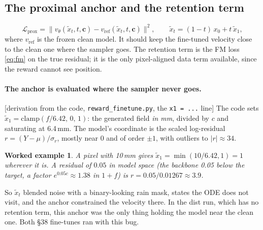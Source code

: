 \documentclass[11pt,a4paper]{article}
\newcommand{\status}[1]{\textsf{\small[#1]}}
\newtheorem*{example}{Worked example}
\begin{document}
\subsection{The proximal anchor and the retention term}
\begin{equation}
  \mathcal L_{\mathrm{prox}} = \big\|v_\theta(\tilde x_t, t,\mathbf c) - v_{\mathrm{ref}}(\tilde x_t,t,\mathbf c)\big\|^2,
  \qquad \tilde x_t = (1-t)\,x_0 + t\,\tilde x_1,
\end{equation}
where $v_{\mathrm{ref}}$ is the frozen clean model. It should keep the fine-tuned velocity close to the clean one where
the sampler goes. The retention term is the FM loss \eqref{eq:fm} on the true residual; it is the only pixel-aligned
data term available, since the reward cannot see position.

\paragraph{The anchor is evaluated where the sampler never goes.} \status{derivation from the code,
\texttt{reward\_finetune.py}, the \texttt{x1 = ...} line} The code sets $\tilde x_1 = \mathrm{clamp}(f/6.42,\,0,\,1)$: the
generated field \emph{in mm}, divided by $c$ and saturating at 6.4\,mm. The model's coordinate is the scaled
log-residual $r = (Y-\mu)/\sigma_r$, mostly near 0 and of order $\pm1$, with outliers to $|r|\approx 34$.
\begin{example}
A pixel with 10\,mm gives $\tilde x_1 = \min(10/6.42, 1) = 1$ wherever it is. A residual of $0.05$ in model space (the
backbone 0.05 below the target, a factor $e^{0.05c}\approx1.38$ in $1+f$) is $r = 0.05/0.01267 \approx 3.9$.
\end{example}
\noindent So $\tilde x_t$ blended noise with a binary-looking rain mask, states the ODE does not visit, and the anchor
constrained the velocity there. In the dist run, which has no retention term, this anchor was the only thing holding the
model near the clean one. Both \S38 fine-tunes ran with this bug.
\end{document}
